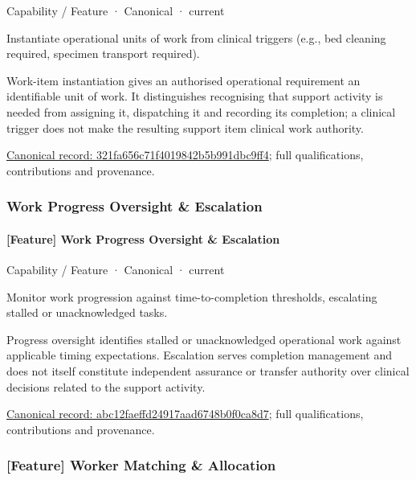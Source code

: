 \label{element:321fa656c71f4019842b5b991dbc9ff4}
{\small Capability / Feature · Canonical · current}\par

Instantiate operational units of work from clinical triggers (e.g., bed cleaning required, specimen transport required).



Work-item instantiation gives an authorised operational requirement an identifiable unit of work. It distinguishes recognising that support activity is needed from assigning it, dispatching it and recording its completion; a clinical trigger does not make the resulting support item clinical work authority.


{\footnotesize \href{../../../../continuum/strategy/capability/feature/321fa656c71f4019842b5b991dbc9ff4.md}{Canonical record: 321fa656c71f4019842b5b991dbc9ff4}; full qualifications, contributions and provenance.}\par
\subsubsection{Work Progress Oversight \& Escalation}

\paragraph{[Feature] Work Progress Oversight \& Escalation}

\label{element:abc12faeffd24917aad6748b0f0ca8d7}
{\small Capability / Feature · Canonical · current}\par

Monitor work progression against time-to-completion thresholds, escalating stalled or unacknowledged tasks.



Progress oversight identifies stalled or unacknowledged operational work against applicable timing expectations. Escalation serves completion management and does not itself constitute independent assurance or transfer authority over clinical decisions related to the support activity.


{\footnotesize \href{../../../../continuum/strategy/capability/feature/abc12faeffd24917aad6748b0f0ca8d7.md}{Canonical record: abc12faeffd24917aad6748b0f0ca8d7}; full qualifications, contributions and provenance.}\par
\subsubsection{[Feature] Worker Matching \& Allocation}


